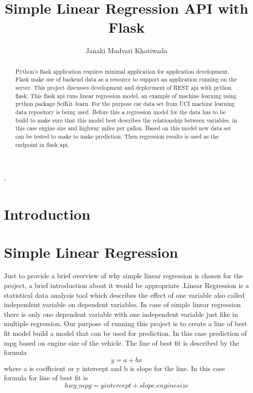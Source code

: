 \title{Simple Linear Regression API with Flask}



\author{Janaki Mudvari Khatiwada}


\renewcommand{\shortauthors}{J. M. Khatiwada}



\begin{abstract}
  Python's flask application requires minimal application for application
  development. Flask make use of backend data as a resource to support an
  application running on the server. This project discusses development
  and deployment of REST api with python flask. This flask api runs linear
  regression model, an example of machine learning using python package
  SciKit--learn. For the purpose car data set from UCI machine learning
  data repository is being used. Before this a regression model for the
  data has to be build to make sure that this model best describes the 
  relationship between variables, in this case engine size and highway
  miles per gallon. Based on this model new data set can be tested to make 
  to make prediction. Then regression results is used as the endpoint 
  in flask api.
   
\end{abstract}



\maketitle`

\section{Introduction}
 
\section{Simple Linear Regression}
  Just to provide a brief overview of why simple linear regression is
  chosen for the project, a brief introduction about it would be
  appropriate .Linear Regression is a statistical data analysis tool
  which describes the effect of one variable also called independent
  variable on dependent variables. In case of simple linear regression
  there is only one dependent variable with one independent variable
  just like in multiple regression. Our purpose of running this project
  is to create a line of best fit model build a model that can be used
  for prediction. In this case prediction of mpg based on engine size
  of the vehicle. The line of best fit is described by the
  formula \[y = a + bx\] where a is coefficient or y intercept and b is
  slope for the line. In this case formula for line of best fit is
 \[hwy\_mpg = yintercept + slope.enginesize\] 

